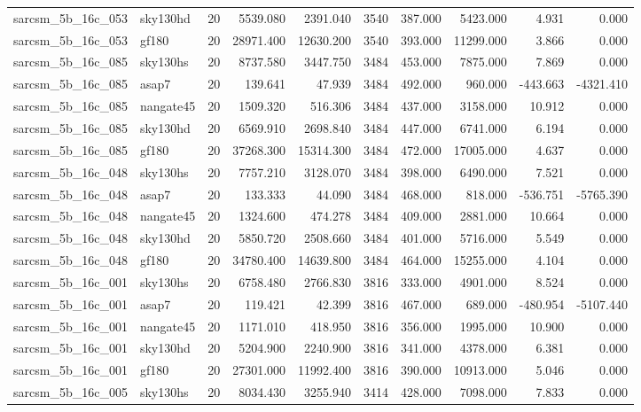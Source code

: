 \begin{tabular}{llrrrrrrrr}
sarcsm\_5b\_16c\_053 & sky130hd & 20 & 5539.080 & 2391.040 & 3540 & 387.000 & 5423.000 & 4.931 & 0.000 \\
sarcsm\_5b\_16c\_053 & gf180 & 20 & 28971.400 & 12630.200 & 3540 & 393.000 & 11299.000 & 3.866 & 0.000 \\
sarcsm\_5b\_16c\_085 & sky130hs & 20 & 8737.580 & 3447.750 & 3484 & 453.000 & 7875.000 & 7.869 & 0.000 \\
sarcsm\_5b\_16c\_085 & asap7 & 20 & 139.641 & 47.939 & 3484 & 492.000 & 960.000 & -443.663 & -4321.410 \\
sarcsm\_5b\_16c\_085 & nangate45 & 20 & 1509.320 & 516.306 & 3484 & 437.000 & 3158.000 & 10.912 & 0.000 \\
sarcsm\_5b\_16c\_085 & sky130hd & 20 & 6569.910 & 2698.840 & 3484 & 447.000 & 6741.000 & 6.194 & 0.000 \\
sarcsm\_5b\_16c\_085 & gf180 & 20 & 37268.300 & 15314.300 & 3484 & 472.000 & 17005.000 & 4.637 & 0.000 \\
sarcsm\_5b\_16c\_048 & sky130hs & 20 & 7757.210 & 3128.070 & 3484 & 398.000 & 6490.000 & 7.521 & 0.000 \\
sarcsm\_5b\_16c\_048 & asap7 & 20 & 133.333 & 44.090 & 3484 & 468.000 & 818.000 & -536.751 & -5765.390 \\
sarcsm\_5b\_16c\_048 & nangate45 & 20 & 1324.600 & 474.278 & 3484 & 409.000 & 2881.000 & 10.664 & 0.000 \\
sarcsm\_5b\_16c\_048 & sky130hd & 20 & 5850.720 & 2508.660 & 3484 & 401.000 & 5716.000 & 5.549 & 0.000 \\
sarcsm\_5b\_16c\_048 & gf180 & 20 & 34780.400 & 14639.800 & 3484 & 464.000 & 15255.000 & 4.104 & 0.000 \\
sarcsm\_5b\_16c\_001 & sky130hs & 20 & 6758.480 & 2766.830 & 3816 & 333.000 & 4901.000 & 8.524 & 0.000 \\
sarcsm\_5b\_16c\_001 & asap7 & 20 & 119.421 & 42.399 & 3816 & 467.000 & 689.000 & -480.954 & -5107.440 \\
sarcsm\_5b\_16c\_001 & nangate45 & 20 & 1171.010 & 418.950 & 3816 & 356.000 & 1995.000 & 10.900 & 0.000 \\
sarcsm\_5b\_16c\_001 & sky130hd & 20 & 5204.900 & 2240.900 & 3816 & 341.000 & 4378.000 & 6.381 & 0.000 \\
sarcsm\_5b\_16c\_001 & gf180 & 20 & 27301.000 & 11992.400 & 3816 & 390.000 & 10913.000 & 5.046 & 0.000 \\
sarcsm\_5b\_16c\_005 & sky130hs & 20 & 8034.430 & 3255.940 & 3414 & 428.000 & 7098.000 & 7.833 & 0.000 \\

\end{tabular}
